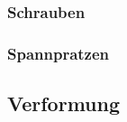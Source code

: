     \subsubsection{Schrauben}

    \subsubsection{Spannpratzen}


  \subsection{Verformung}
\newpage
